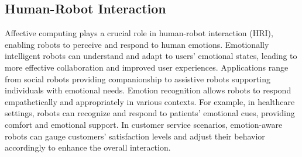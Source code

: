 \subsection{Human-Robot Interaction}
Affective computing plays a crucial role in human-robot interaction (HRI), enabling robots to perceive and respond to human emotions. 
Emotionally intelligent robots can understand and adapt to users' emotional states, leading to more effective collaboration and improved user experiences. 
Applications range from social robots providing companionship to assistive robots supporting individuals with emotional needs. 
Emotion recognition allows robots to respond empathetically and appropriately in various contexts. 
For example, in healthcare settings, robots can recognize and respond to patients' emotional cues, providing comfort and emotional support. 
In customer service scenarios, emotion-aware robots can gauge customers' satisfaction levels and adjust their behavior accordingly to enhance the overall interaction.